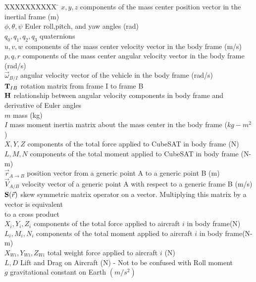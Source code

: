 \documentclass{article}
\begin{document}
\begin{tabbing}
  XXXXXXXXXX \= \kill%
  $x,y,z$ \> components of the mass center position vector in the
  inertial frame (m)  \\
  $\phi,\theta,\psi$ \> Euler roll,pitch, and yaw angles (rad) \\
  $q_0,q_1,q_2,q_3$ \>  quaternions \\  
  $u,v,w$ \> components of the mass center velocity vector in the
  body frame (m/s)  \\
  $p,q,r$ \> components of the mass center angular velocity vector in the
  body frame (rad/s)  \\
  $\vec{\omega}_{B/I}$ \> angular velocity vector of the vehicle in
  the body frame (rad/s) \\
  ${\bf T}_{IB}$ \> rotation matrix from frame I to frame B \\
  ${\bf H}$ \> relationship between angular velocity components in
  body frame and derivative of Euler angles \\
  $m$ \> mass (kg) \\
  $I$ \> mass moment inertia matrix about the mass center
  in the body frame ($kg-m^2$)  \\
  $X,Y,Z$ \> components of the total force applied to CubeSAT in
  body frame (N)  \\
  $L,M,N$ \> components of the total moment applied to CubeSAT in
  body frame (N-m)  \\
  ${\vec r}_{A\rightarrow B}$ \> position vector from a generic point A
  to a generic point B (m) \\
  ${\vec V}_{A/B}$ \> velocity vector of a generic point A
  with respect to a generic frame B (m/s) \\
  ${\bf S}(\vec{r})$ \> skew symmetric matrix operator on a
  vector. Multiplying this matrix by a vector is equivalent \\
  \> to a cross product\\
    $X_i,Y_i,Z_i$ \> components of the total force applied to aircraft $i$ in
  body frame(N) \\
  $L_i,M_i,N_i$ \> components of the total moment applied to aircraft
  $i$ in body frame(N-m) \\
  $X_{Wi},Y_{Wi},Z_{Wi}$ \> total weight force applied to aircraft
  $i$ (N) \\
  $L,D$ \> Lift and Drag on Aircraft (N) - Not to be confused with Roll moment\\
  $g$ \> gravitational constant on Earth $(m/s^2)$ \\

\end{tabbing}
\end{document}
